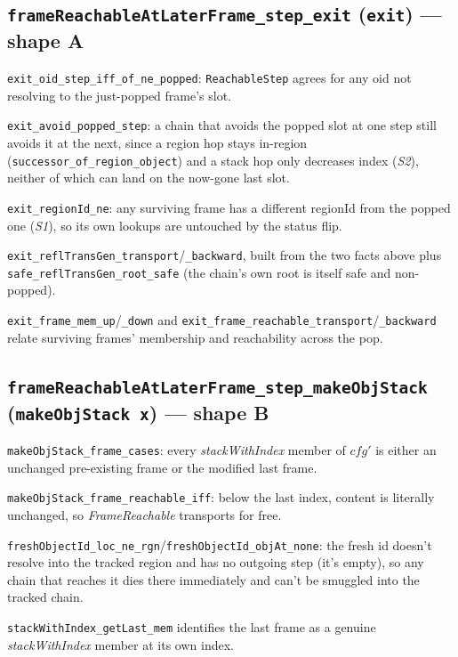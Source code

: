 \documentclass[11pt]{article}
\newcommand{\op}[1]{\texttt{#1}}
\newcommand{\thm}[1]{\textbf{\texttt{#1}}}
\begin{document}
\subsection{\thm{frameReachableAtLaterFrame\_step\_exit} (\op{exit}) --- shape A}
\begin{description}[nosep]
  \item[Step relation, restricted] \texttt{exit\_oid\_step\_iff\_of\_ne\_popped}:
    \texttt{ReachableStep} agrees for any oid not resolving to the just-popped frame's slot.
  \item[Avoiding the popped slot] \texttt{exit\_avoid\_popped\_step}: a chain that avoids the
    popped slot at one step still avoids it at the next, since a region hop stays in-region
    (\texttt{successor\_of\_region\_object}) and a stack hop only decreases index (\textit{S2}),
    neither of which can land on the now-gone last slot.
  \item[Distinctness] \texttt{exit\_regionId\_ne}: any surviving frame has a different regionId
    from the popped one (\textit{S1}), so its own lookups are untouched by the status flip.
  \item[Transport, both ways] \texttt{exit\_reflTransGen\_transport}/\texttt{\_backward}, built
    from the two facts above plus \texttt{safe\_reflTransGen\_root\_safe} (the chain's own root is
    itself safe and non-popped).
  \item[Frame bookkeeping] \texttt{exit\_frame\_mem\_up}/\texttt{\_down} and
    \texttt{exit\_frame\_reachable\_transport}/\texttt{\_backward} relate surviving frames'
    membership and reachability across the pop.
\end{description}

\subsection{\thm{frameReachableAtLaterFrame\_step\_makeObjStack} (\op{makeObjStack x}) --- shape B}
\begin{description}[nosep]
  \item[Frame cases] \texttt{makeObjStack\_frame\_cases}: every \textit{stackWithIndex} member of
    $cfg'$ is either an unchanged pre-existing frame or the modified last frame.
  \item[Untouched case] \texttt{makeObjStack\_frame\_reachable\_iff}: below the last index,
    content is literally unchanged, so \textit{FrameReachable} transports for free.
  \item[The dead end] \texttt{freshObjectId\_loc\_ne\_rgn}/\texttt{freshObjectId\_objAt\_none}: the
    fresh id doesn't resolve into the tracked region and has no outgoing step (it's empty), so any
    chain that reaches it dies there immediately and can't be smuggled into the tracked chain.
  \item[Bookkeeping] \texttt{stackWithIndex\_getLast\_mem} identifies the last frame as a genuine
    \textit{stackWithIndex} member at its own index.
\end{description}
\end{document}
